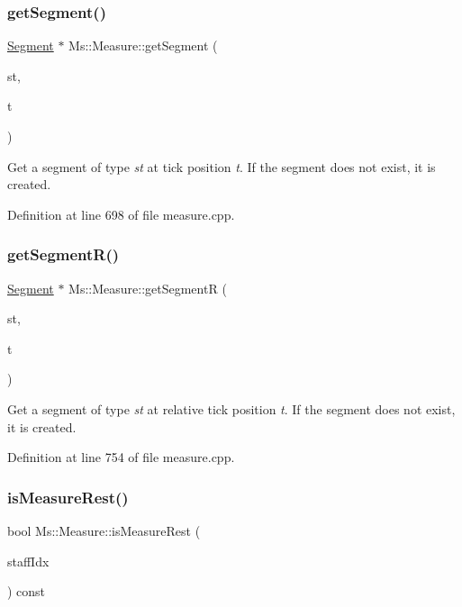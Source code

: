 \subsubsection{\texorpdfstring{get\+Segment()}{getSegment()}}
{\footnotesize\ttfamily \hyperlink{class_ms_1_1_segment}{Segment} $\ast$ Ms\+::\+Measure\+::get\+Segment (\begin{DoxyParamCaption}\item[{Segment\+Type}]{st,  }\item[{int}]{t }\end{DoxyParamCaption})}

Get a segment of type {\itshape st} at tick position {\itshape t}. If the segment does not exist, it is created. 

Definition at line 698 of file measure.\+cpp.

\mbox{\label{class_ms_1_1_measure_ad245c1b7912df13ee99f673c4cf69045}} 
\subsubsection{\texorpdfstring{get\+Segment\+R()}{getSegmentR()}}
{\footnotesize\ttfamily \hyperlink{class_ms_1_1_segment}{Segment} $\ast$ Ms\+::\+Measure\+::get\+SegmentR (\begin{DoxyParamCaption}\item[{Segment\+Type}]{st,  }\item[{int}]{t }\end{DoxyParamCaption})}

Get a segment of type {\itshape st} at relative tick position {\itshape t}. If the segment does not exist, it is created. 

Definition at line 754 of file measure.\+cpp.

\mbox{\label{class_ms_1_1_measure_aeeafec0568970fc37381787f03ea35cd}} 
\subsubsection{\texorpdfstring{is\+Measure\+Rest()}{isMeasureRest()}}
{\footnotesize\ttfamily bool Ms\+::\+Measure\+::is\+Measure\+Rest (\begin{DoxyParamCaption}\item[{int}]{staff\+Idx }\end{DoxyParamCaption}) const}

